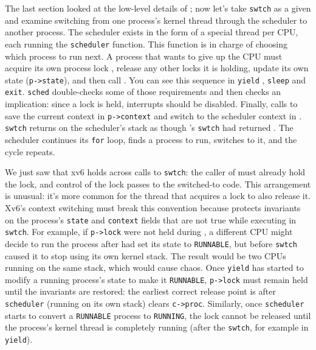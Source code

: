 The last section looked at the low-level details of
;
now let's take 
\lstinline{swtch}
as a given and examine 
switching from one process's kernel thread
through the scheduler to another process.
The scheduler exists in the form of a special thread per CPU, each running the
\lstinline{scheduler}
function.
This function is in charge of choosing which process to run next.
A process
that wants to give up the CPU must
acquire its own process lock
,
release any other locks it is holding,
update its own state
(\lstinline{p->state}),
and then call
.
You can see this sequence in
\lstinline{yield}
,
\texttt{sleep}
and
\texttt{exit}.
\lstinline{sched}
double-checks some of those requirements
and then checks an implication:
since a lock is held, interrupts should be disabled.
Finally,
calls
to save the current context in 
\lstinline{p->context}
and switch to the scheduler context in
.
\lstinline{swtch}
returns on the scheduler's stack
as though
's
\lstinline{swtch}
had returned
.
The scheduler continues its
\lstinline{for}
loop, finds a process to run, 
switches to it, and the cycle repeats.

We just saw that xv6 holds
across calls to
\lstinline{swtch}:
the caller of
must already hold the lock, and control of the lock passes to the
switched-to code.  This arrangement is unusual: it's more common for
the thread that acquires a lock to also release it.
Xv6's context switching must break this convention because
protects invariants on the process's
\lstinline{state}
and
\lstinline{context}
fields that are not true while executing in
\lstinline{swtch}.
For example, if
\lstinline{p->lock}
were not held during
,
a different CPU might decide
to run the process after 
had set its state to
\lstinline{RUNNABLE},
but before 
\lstinline{swtch}
caused it to stop using its own kernel stack.
The result would be two CPUs running on the same stack,
which would cause chaos.
Once \lstinline{yield} has started to modify a running process's state
to make it
\lstinline{RUNNABLE},
\lstinline{p->lock} must remain held until the invariants are restored:
the earliest correct release point is after
\lstinline{scheduler}
(running on its own stack)
clears
\lstinline{c->proc}.
Similarly, once 
\lstinline{scheduler}
starts to convert a \lstinline{RUNNABLE} process to
\lstinline{RUNNING},
the lock cannot be released until the process's kernel thread
is completely running (after the
\lstinline{swtch},
for example in
\lstinline{yield}).

